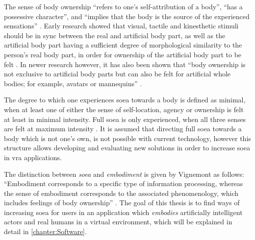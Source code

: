 The sense of body ownership \enquote{refers to one’s self-attribution of a body}, \enquote{has a possessive character}, and \enquote{implies that the body is the source of the experienced sensations} \autocite[p. ~5]{senseEmbodimentVR}.
\newline
Early research showed that visual, tactile and kinesthetic stimuli should be in sync between the real and artificial body part, as well as the artificial body part having a sufficient degree of morphological similarity to the person's real body part, in order for ownership of the artificial body part to be felt \autocite{senseEmbodimentVR}. In newer research however, it has also been shown that \enquote{body ownership is not exclusive to artificial body parts but can also be felt for artificial whole bodies; for example, avatars or mannequins} \autocite[p. ~5]{senseEmbodimentVR}.
\newline

The degree to which one experiences \gls{soea} towards a body is defined as minimal, when at least one of either the sense of self-location, agency or ownership is felt at least in minimal intensity. Full \gls{soea} is only experienced, when all three senses are felt at maximum intensity \autocite{senseEmbodimentVR}. It is assumed that directing full \gls{soea} towards a body which is not one's own, is not possible with current technology, however this structure allows developing and evaluating new solutions in order to increase \gls{soea} in \gls{vra} applications.
\newline

The distinction between \textit{\gls{soea}} and \textit{embodiment} is given by Vignemont as follows: \enquote{Embodiment corresponds to a specific type of information processing, whereas the sense of embodiment corresponds to the associated phenomenology, which includes feelings of body ownership} \autocite[p. ~3]{embodimentOwnership}.
The goal of this thesis is to find ways of increasing \gls{soea} for users in an application which \textit{embodies} artificially intelligent actors and real humans in a virtual environment, which will be explained in detail in \autoref{chapter:Software}.